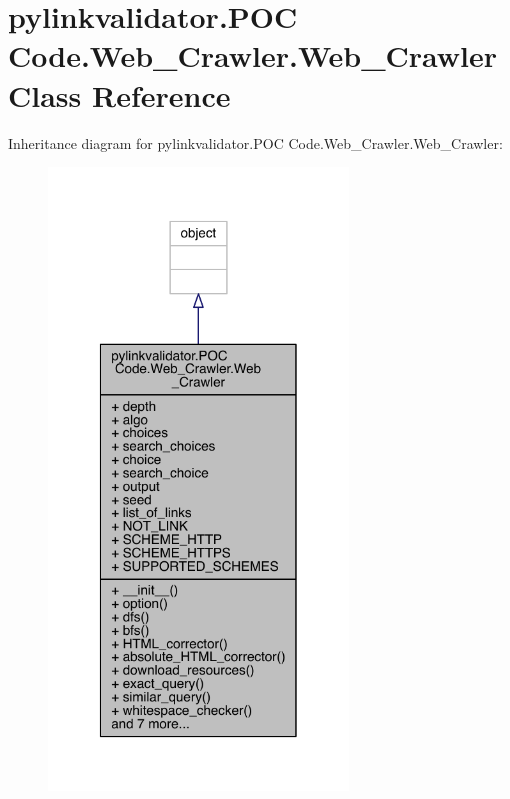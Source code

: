 \hypertarget{classpylinkvalidator_1_1_p_o_c_01_code_1_1_web___crawler_1_1_web___crawler}{}\section{pylinkvalidator.\+P\+OC Code.\+Web\+\_\+\+Crawler.\+Web\+\_\+\+Crawler Class Reference}
\label{classpylinkvalidator_1_1_p_o_c_01_code_1_1_web___crawler_1_1_web___crawler}


Inheritance diagram for pylinkvalidator.\+P\+OC Code.\+Web\+\_\+\+Crawler.\+Web\+\_\+\+Crawler\+:
\nopagebreak
\begin{figure}[H]
\begin{center}
\leavevmode
\includegraphics[width=226pt]{classpylinkvalidator_1_1_p_o_c_01_code_1_1_web___crawler_1_1_web___crawler__inherit__graph}
\end{center}
\end{figure}


